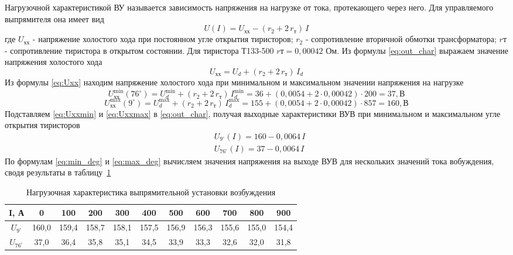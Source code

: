 Нагрузочной характеристикой ВУ называется зависимость напряжения на нагрузке от тока, протекающего через него. Для управляемого выпрямителя она имеет вид
\begin{equation}
 \label{eq:out_char}
 U(I) = U_{\text{хх}} - (r_2 + 2 \, r_{\text{т}}) \, I
\end{equation}
где $U_{\text{хх}}$ - напряжение холостого хода при постоянном угле открытия тиристоров; $r_2$ - сопротивление вторичной обмотки трансформатора; $r{\text{т}}$ - сопротивление тиристора в открытом состоянии. Для тиристора Т133-500 $r{\text{т}} = 0,00042$ Ом. Из формулы \eqref{eq:out_char} выражаем значение напряжения холостого хода
\begin{equation}
 \label{eq:Uxx}
 U_{\text{хх}} = U_d + (r_2 + 2 \, r_{\text{т}}) \, I_d
\end{equation}
Из формулы \eqref{eq:Uxx} находим напряжение холостого хода при минимальном и максимальном значении напряжения на нагрузке
\begin{equation}
\label{eq:Uxxmin}
 U_{\text{хх}}^{\min}(76^{\circ}) = U_d^{\min} + (r_2 + 2 \, r_{\text{т}}) \, I_d^{\min} = 36 + (0,0054 + 2 \cdot 0,00042) \cdot 200 = 37, \text{В}
\end{equation}
\begin{equation}
\label{eq:Uxxmax}
 U_{\text{хх}}^{\max}(9^{\circ}) = U_d^{\max} + (r_2 + 2 \, r_{\text{т}}) \, I_d^{\max} = 155 + (0,0054 + 2 \cdot 0,00042) \cdot 857 = 160, \text{В}
\end{equation}
Подставляем \eqref{eq:Uxxmin} и \eqref{eq:Uxxmax} в \eqref{eq:out_char}, получая выходные характеристики ВУВ при минимальном и максимальном угле открытия тиристоров
\begin{align}
 \label{eq:min_deg}
 & U_{9^{\circ}}(I) = 160 - 0,0064 \, I \\
 \label{eq:max_deg}
 & U_{76^{\circ}}(I) = 37 - 0,0064 \, I 
\end{align}
По формулам \eqref{eq:min_deg} и \eqref{eq:max_deg} вычисляем  значения напряжения на выходе ВУВ для нескольких значений тока вобуждения, сводя результаты в таблицу~\ref{tab:out_char} 

\begin{table}[H]
 \centering
 \caption{Нагрузочная характеристика выпрямительной установки возбуждения}
 \begin{tabular}{|c|c|c|c|c|c|c|c|c|c|c|}
  \hline
  I, А & 0 & 100 & 200 & 300 & 400 & 500 & 600 & 700 & 800 & 900 \\ \hline
  $U_{9^{\circ}}$ & 160,0 & 159,4  & 158,7 & 158,1 & 157,5 & 156,9 & 156,3 & 155,6 & 155,0 & 154,4\\ \hline
  $U_{76^{\circ}}$ & 37,0 & 36,4 & 35,8 & 35,1 & 34,5 & 33,9 & 33,3 & 32,6 & 32,0 & 31,8  \\ \hline
 \end{tabular}
 \label{tab:out_char}
\end{table}

